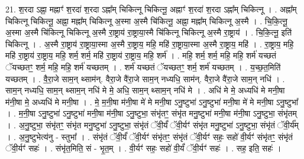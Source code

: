 \documentclass[17pt]{extarticle}
\begin{document}
21. श॒रदा ऽह्ना॒ मह्नाꣳ॑ श॒रदा॑ श॒रदा ऽह्ना᳚म् चिकित्नू चिकित्नू॒ अह्नाꣳ॑ श॒रदा॑ श॒रदा ऽह्ना᳚म् चिकित्नू । . अह्ना᳚म् चिकित्नू चिकित्नू॒ अह्ना॒ मह्ना᳚म् चिकित्नू अ॒स्मा अ॒स्मै चि॑कित्नू॒ अह्ना॒ मह्ना᳚म् चिकित्नू अ॒स्मै । . चि॒कि॒त्नू॒ अ॒स्मा अ॒स्मै चि॑कित्नू चिकित्नू अ॒स्मै रा॒ष्ट्राय॑ रा॒ष्ट्राया॒स्मै चि॑कित्नू चिकित्नू अ॒स्मै रा॒ष्ट्राय॑ । . चि॒कि॒त्नू॒ इति॑ चिकित्नू । . अ॒स्मै रा॒ष्ट्राय॑ रा॒ष्ट्राया॒स्मा अ॒स्मै रा॒ष्ट्राय॒ महि॒ महि॑ रा॒ष्ट्राया॒स्मा अ॒स्मै रा॒ष्ट्राय॒ महि॑ । . रा॒ष्ट्राय॒ महि॒ महि॑ रा॒ष्ट्राय॑ रा॒ष्ट्राय॒ महि॒ शर्म॒ शर्म॒ महि॑ रा॒ष्ट्राय॑ रा॒ष्ट्राय॒ महि॒ शर्म॑ । . महि॒ शर्म॒ शर्म॒ महि॒ महि॒ शर्म॑ यच्छतं ॅयच्छतꣳ॒॒ शर्म॒ महि॒ महि॒ शर्म॑ यच्छतम् । . शर्म॑ यच्छतं ॅयच्छतꣳ॒॒ शर्म॒ शर्म॑ यच्छतम् । . य॒च्छ॒त॒मिति॑ यच्छतम् । . वै॒रा॒जे साम॒न् थ्साम॑न्. वैरा॒जे वै॑रा॒जे साम॒न् नध्यधि॒ साम॑न्. वैरा॒जे वै॑रा॒जे साम॒न् नधि॑ । . साम॒न् नध्यधि॒ साम॒न् थ्साम॒न् नधि॑ मे मे॒ अधि॒ साम॒न् थ्साम॒न् नधि॑ मे । . अधि॑ मे मे॒ अध्यधि॑ मे मनी॒षा म॑नी॒षा मे॒ अध्यधि॑ मे मनी॒षा । . मे॒ म॒नी॒षा म॑नी॒षा मे॑ मे मनी॒षा ऽनु॒ष्टुभा॑ ऽनु॒ष्टुभा॑ मनी॒षा मे॑ मे मनी॒षा ऽनु॒ष्टुभा᳚ । . म॒नी॒षा ऽनु॒ष्टुभा॑ ऽनु॒ष्टुभा॑ मनी॒षा म॑नी॒षा ऽनु॒ष्टुभा॒ संभृ॑तꣳ॒॒ संभृ॑त मनु॒ष्टुभा॑ मनी॒षा म॑नी॒षा ऽनु॒ष्टुभा॒ संभृ॑तम् । . अ॒नु॒ष्टुभा॒ संभृ॑तꣳ॒॒ संभृ॑त मनु॒ष्टुभा॑ ऽनु॒ष्टुभा॒ संभृ॑तं ॅवी॒र्यं॑ ॅवी॒र्यꣳ॑ संभृ॑त मनु॒ष्टुभा॑ ऽनु॒ष्टुभा॒ संभृ॑तं ॅवी॒र्य᳚म् । . अ॒नु॒ष्टुभेत्य॑नु - स्तुभा᳚ । . संभृ॑तं ॅवी॒र्यं॑ ॅवी॒र्यꣳ॑ संभृ॑तꣳ॒॒ संभृ॑तं ॅवी॒र्यꣳ॑ सहः॒ सहो॑ वी॒र्यꣳ॑ 
संभृ॑तꣳ॒॒ संभृ॑तं ॅवी॒र्यꣳ॑ सहः॑ । . संभृ॑त॒मिति॒ सं - भृ॒त॒म् । . वी॒र्यꣳ॑ सहः॒ सहो॑ वी॒र्यं॑ ॅवी॒र्यꣳ॑ सहः॑ । . सह॒ इति॒ सहः॑ । \newline
\end{document}
